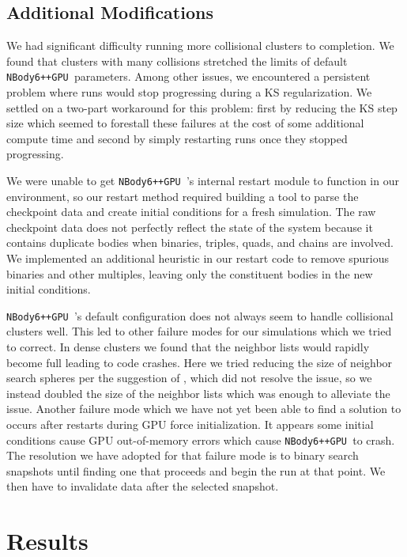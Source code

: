 \documentclass[preprint1]{aastex}
\newcommand\nbody{\texttt{NBody6++GPU }}
\numberwithin{equation}{section}
\begin{document}
\subsection{Additional Modifications}
We had significant difficulty running more collisional clusters to completion.  We found that clusters with many collisions stretched the limits of default \nbody parameters.  Among other issues, we encountered a persistent problem where runs would stop progressing during a KS regularization.  We settled on a two-part workaround for this problem: first by reducing the KS step size which seemed to forestall these failures at the cost of some additional compute time and second by simply restarting runs once they stopped progressing. 

We were unable to get \nbody's internal restart module to function in our environment, so our restart method required building a tool to parse the checkpoint data and create initial conditions for a fresh simulation.  The raw checkpoint data does not perfectly reflect the state of the system because it contains duplicate bodies when binaries, triples, quads, and chains are involved. We implemented an additional heuristic in our restart code to remove spurious binaries and other multiples, leaving only the constituent bodies in the new initial conditions.

\nbody's default configuration does not always seem to handle collisional clusters well. This led to other failure modes for our simulations which we tried to correct. In dense clusters we found that the neighbor lists would rapidly become full leading to code crashes.  Here we tried reducing the size of neighbor search spheres per the suggestion of \citet[][personal communication]{2017Wang}, which did not resolve the issue, so we instead doubled the size of the neighbor lists which was enough to alleviate the issue. Another failure mode which we have not yet been able to find a solution to occurs after restarts during GPU force initialization. It appears some initial conditions cause GPU out-of-memory errors which cause \nbody to crash. The resolution we have adopted for that failure mode is to binary search snapshots until finding one that proceeds and begin the run at that point.  We then have to invalidate data after the selected snapshot.

\section{Results} \label{Results}
\end{document}
